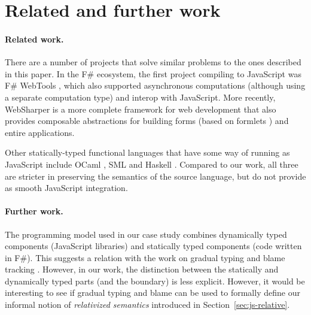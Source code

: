 \documentclass[submission,copyright,creativecommons]{eptcs}
\begin{document}

\section{Related and further work}
\label{sec:conc-interop}

\paragraph{Related work.}

There are a number of projects that solve similar problems to the ones described in this paper.
In the F\# ecosystem, the first project compiling to JavaScript was F\# WebTools \cite{fsharp-webtools},
which also supported asynchronous computations (although using a separate computation type)
and interop with JavaScript. More recently, WebSharper \cite{websharper-piglets,websharper-guis}
is a more complete framework for web development that also provides composable abstractions for
building forms (based on formlets \cite{links-formlets}) and entire applications.

Other statically-typed functional languages that have some way of running as JavaScript
include OCaml \cite{js_ocmal}, SML \cite{js_sml} and Haskell \cite{haskell-ghcjs}. Compared to
our work, all three are stricter in preserving the semantics of the source language, but
do not provide as smooth JavaScript integration.

\vspace{-1em}
\paragraph{Further work.}
The programming model used in our case study combines dynamically typed components (JavaScript
libraries) and statically typed components (code written in F\#). This suggests a relation with
the work on gradual typing \cite{gradual-fun,gradual-oop} and blame tracking \cite{blame-well}. However,
in our work, the distinction between the statically and dynamically typed parts (and the boundary)
is less explicit. However, it would be interesting to see if gradual typing and blame can be
used to formally define our informal notion of \emph{relativized semantics} introduced in
Section~\ref{sec:js-relative}.

\end{document}
